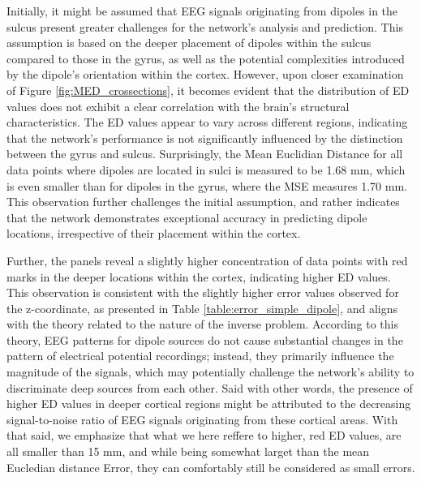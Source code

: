 \documentclass[a4paper, UKenglish, 11pt]{uiomaster}
\begin{document}
Initially, it might be assumed that EEG signals originating from dipoles in the sulcus present greater challenges for the network's analysis and prediction. This assumption is based on the deeper placement of dipoles within the sulcus compared to those in the gyrus, as well as the potential complexities introduced by the dipole's orientation within the cortex. However, upon closer examination of Figure \ref{fig:MED_crossections}, it becomes evident that the distribution of ED values does not exhibit a clear correlation with the brain's structural characteristics. The ED values appear to vary across different regions, indicating that the network's performance is not significantly influenced by the distinction between the gyrus and sulcus. Surprisingly, the Mean Euclidian Distance for all data points where dipoles are located in sulci is measured to be 1.68 mm, which is even smaller than for dipoles in the gyrus, where the MSE measures 1.70 mm. This observation further challenges the initial assumption, and rather indicates that the network demonstrates exceptional accuracy in predicting dipole locations, irrespective of their placement within the cortex.


Further, the panels reveal a slightly higher concentration of data points with red marks in the deeper locations within the cortex, indicating higher ED values. This observation is consistent with the slightly higher error values observed for the z-coordinate, as presented in Table \ref{table:error_simple_dipole}, and aligns with the theory related to the nature of the inverse problem. According to this theory, EEG patterns for dipole sources do not cause substantial changes in the pattern of electrical potential recordings; instead, they primarily influence the magnitude of the signals, which may potentially challenge the network's ability to discriminate deep sources from each other. Said with other words, the presence of higher ED values in deeper cortical regions might be attributed to the decreasing signal-to-noise ratio of EEG signals originating from these cortical areas. With that said, we emphasize that what we here reffere to higher, red ED values, are all smaller than 15 mm, and while being somewhat larget than the mean Eucledian distance Error, they can comfortably still be considered as small errors.
\end{document}

